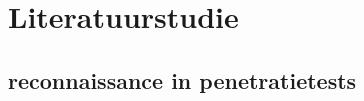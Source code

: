 








\section{Literatuurstudie}%
\label{sec:literatuurstudie}

\autocite{SabiEtAl2016}

\subsection{reconnaissance in penetratietests}

